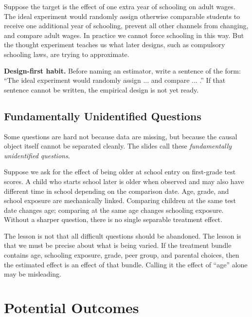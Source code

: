 \begin{exmp}
Suppose the target is the effect of one extra year of schooling on adult wages.
The ideal experiment would randomly assign otherwise comparable students to
receive one additional year of schooling, prevent all other channels from
changing, and compare adult wages. In practice we cannot force schooling in this
way. But the thought experiment teaches us what later designs, such as
compulsory schooling laws, are trying to approximate.
\end{exmp}

\begin{boxD}
\textbf{Design-first habit.} Before naming an estimator, write a sentence of
the form: ``The ideal experiment would randomly assign ... and compare ... .''
If that sentence cannot be written, the empirical design is not yet ready.
\end{boxD}

\subsection{Fundamentally Unidentified Questions}

Some questions are hard not because data are missing, but because the causal
object itself cannot be separated cleanly. The slides call these
\emph{fundamentally unidentified questions}.

\begin{exmp}
Suppose we ask for the effect of being older at school entry on first-grade test
scores. A child who starts school later is older when observed and may also have
different time in school depending on the comparison date. Age, grade, and
school exposure are mechanically linked. Comparing children at the same test
date changes age; comparing at the same age changes schooling exposure. Without
a sharper question, there is no single separable treatment effect.
\end{exmp}

The lesson is not that all difficult questions should be abandoned. The lesson
is that we must be precise about what is being varied. If the treatment bundle
contains age, schooling exposure, grade, peer group, and parental choices, then
the estimated effect is an effect of that bundle. Calling it the effect of
``age'' alone may be misleading.

\section{Potential Outcomes}


